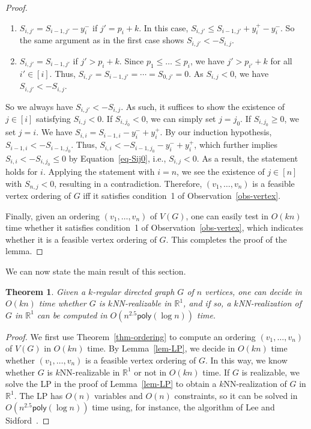 \documentclass[11pt]{article}
\newtheorem{theorem}{Theorem}
\begin{document}
\begin{proof}
\begin{enumerate}
    By our induction hypothesis, $S_{i-1,j'} < -S_{i-1,j}$.
    Thus, $S_{i,j'} < -S_{i-1,j} + y_i^+ - y_i^-$.
    By Equation~\ref{eq-Sij0}, this implies $S_{i,j'} < -S_{i,j}$.
    \item $S_{i,j'} = S_{i-1,j'}-y_i^-$ if $j' = p_i+k$.
    In this case, $S_{i,j'} \leq S_{i-1,j'} + y_i^+ - y_i^-$.
    So the same argument as in the first case shows $S_{i,j'} < -S_{i,j}$.
    \item $S_{i,j'} = S_{i-1,j'}$ if $j' > p_i+k$.
    Since $p_1 \leq \dots \leq p_i$, we have $j' > p_{i'} + k$ for all $i' \in [i]$.
    Thus, $S_{i,j'} = S_{i-1,j'} = \cdots = S_{0,j'} = 0$.
    As $S_{i,j} < 0$, we have $S_{i,j'} < -S_{i,j}$.
\end{enumerate}
So we always have $S_{i,j'} < -S_{i,j}$.
As such, it suffices to show the existence of $j \in [i]$ satisfying $S_{i,j} < 0$.
If $S_{i,j_0} < 0$, we can simply set $j = j_0$.
If $S_{i,j_0} \geq 0$, we set $j = i$.
We have $S_{i,i} = S_{i-1,i} - y_i^- + y_i^+$.
By our induction hypothesis, $S_{i-1,i} < -S_{i-1,j_0}$.
Thus, $S_{i,i} < -S_{i-1,j_0} - y_i^- + y_i^+$, which further implies $S_{i,i} < - S_{i,j_0} \leq 0$ by Equation~\ref{eq-Sij0}, i.e., $S_{i,j} < 0$.
As a result, the statement holds for $i$.
Applying the statement with $i = n$, we see the existence of $j \in [n]$ with $S_{n,j} < 0$, resulting in a contradiction.
Therefore, $(v_1,\dots,v_n)$ is a feasible vertex ordering of $G$ iff it satisfies condition~1 of Observation~\ref{obs-vertex}.

Finally, given an ordering $(v_1,\dots,v_n)$ of $V(G)$, one can easily test in $O(kn)$ time whether it satisfies condition~1 of Observation~\ref{obs-vertex}, which indicates whether it is a feasible vertex ordering of $G$.
This completes the proof of the lemma.
\end{proof}
\noindent
We can now state the main result of this section.

\begin{theorem} \label{thm:final}
Given a $k$-regular directed graph $G$ of $n$ vertices, one can decide in $O(kn)$ time whether $G$ is $k$NN-realizable in $\mathbb{R}^1$, and if so, a $k$NN-realization of $G$ in $\mathbb{R}^1$ can be computed in $O(n^{2.5} \mathsf{poly}(\log n))$ time.
\end{theorem}

\begin{proof}
We first use Theorem~\ref{thm-ordering} to compute an ordering $(v_1,\dots,v_n)$ of $V(G)$ in $O(kn)$ time. By Lemma~\ref{lem-LP}, we decide in $O(kn)$ time whether $(v_1,\dots,v_n)$ is a feasible vertex ordering of $G$. In this way, we know whether $G$ is $k$NN-realizable in $\mathbb{R}^1$ or not in $O(kn)$ time. If $G$ is realizable, we solve the LP in the proof of Lemma~\ref{lem-LP} to obtain a $k$NN-realization of $G$ in $\mathbb{R}^1$. The LP has $O(n)$ variables and $O(n)$ constraints, so it can be solved in $O(n^{2.5} \mathsf{poly} (\log n))$ time using, for instance, the algorithm of Lee and Sidford~\cite{lee2015efficient}.
\end{proof}
\end{document}
